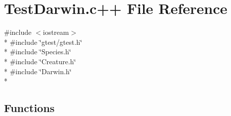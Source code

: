 \hypertarget{TestDarwin_8c_09_09}{\section{Test\-Darwin.\-c++ File Reference}
\label{TestDarwin_8c_09_09}
}
{\ttfamily \#include $<$iostream$>$}\\*
{\ttfamily \#include \char`\"{}gtest/gtest.\-h\char`\"{}}\\*
{\ttfamily \#include \char`\"{}Species.\-h\char`\"{}}\\*
{\ttfamily \#include \char`\"{}Creature.\-h\char`\"{}}\\*
{\ttfamily \#include \char`\"{}Darwin.\-h\char`\"{}}\\*
\subsection*{Functions}
